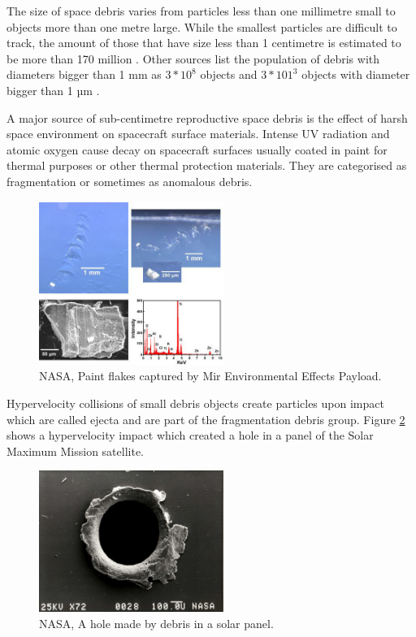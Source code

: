 	The size of space debris varies from particles less than one millimetre small to objects more than one metre large. While the smallest particles are difficult to track, the amount of those that have size less than 1 centimetre is estimated to be more than 170 million \citep{esabr336}. Other sources list the population of debris with diameters bigger than 1 mm as $3*10^8$ objects and $3*101^3$ objects with diameter bigger than 1 µm \citep{klinkrad2006space}. 

	A major source of sub-centimetre reproductive space debris is the effect of harsh space environment on spacecraft surface materials. Intense UV radiation and atomic oxygen cause decay on spacecraft surfaces usually coated in paint for thermal purposes or other thermal protection materials. They are categorised as fragmentation or sometimes as anomalous debris.
	
\begin{figure}[H]
	\centering
  \includegraphics[width=6cm]{images/paintflakes}
  \caption{NASA, Paint flakes captured by Mir Environmental Effects Payload.}
  \label{fig:paintflakes}
\end{figure}
	
	Hypervelocity collisions of small debris objects create particles upon impact which are called ejecta and are part of the fragmentation debris group. Figure \ref{fig:hypervelocitycollision} shows a hypervelocity impact which created a hole in a panel of the Solar Maximum Mission satellite.
	
\begin{figure}[H]
\centering
  \includegraphics[width=6cm]{images/hypervelocitycollision}
  \caption{NASA, A hole made by debris in a solar panel.}
  \label{fig:hypervelocitycollision}
\end{figure}	
	
